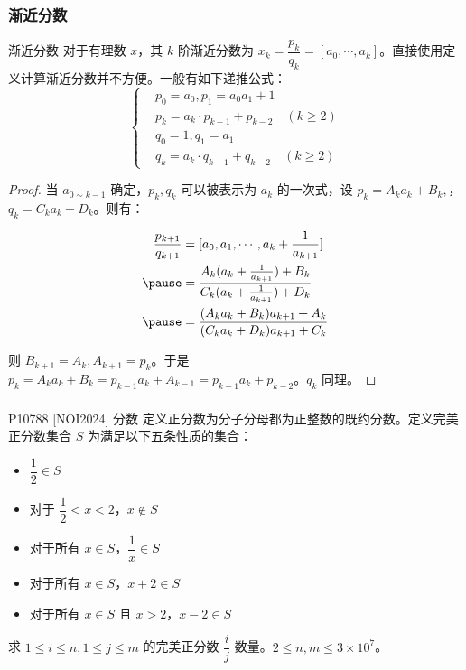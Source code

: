 \documentclass[../main.tex]{subfiles}
\begin{document}
\subsubsection{渐近分数}

\begin{frame}{渐近分数}
对于有理数 $x$，其 $k$ 阶渐近分数为 $x_k=\dfrac{p_k}{q_k}=[a_0,\cdots,a_k]$。直接使用定义计算渐近分数并不方便。一般有如下递推公式：
$$
\left\{
\begin{aligned}
&p_0=a_0,p_1=a_0a_1+1\\
&p_k=a_k\cdot p_{k-1}+p_{k-2}\quad (k\ge 2)\\
&q_0=1,q_1=a_1\\
&q_k=a_k\cdot q_{k-1}+q_{k-2}\quad (k\ge 2)
\end{aligned}
\right.
$$
\end{frame}

\begin{frame}
\begin{proof}
当 $a_{0\sim k-1}$ 确定，$p_k,q_k$ 可以被表示为 $a_k$ 的一次式，设 $p_k=A_ka_k+B_k,$，$q_k=C_ka_k+D_k$。则有：

$$
\begin{aligned}
\frac{p_{k+1}}{q_{k+1}}&=[a_0,a_1,\cdots,a_k+\frac{1}{a_{k+1}}]\\ \pause
&=\frac{A_k(a_k+\frac{1}{a_{k+1}})+B_k}{C_k(a_k+\frac{1}{a_{k+1}})+D_k}\\ \pause
&=\frac{(A_ka_k+B_k)a_{k+1}+A_k}{(C_ka_k+D_k)a_{k+1}+C_k}
\end{aligned}
$$\pause

则 $B_{k+1}=A_k,A_{k+1}=p_k$。于是 $p_k=A_ka_k+B_k=p_{k-1}a_k+A_{k-1}=p_{k-1}a_k+p_{k-2}$。$q_k$ 同理。
\end{proof}
\end{frame}

\subsubsection{}

\begin{frame}{P10788 [NOI2024] 分数}
定义正分数为分子分母都为正整数的既约分数。定义完美正分数集合 $S$ 为满足以下五条性质的集合：

\begin{itemize}
\item $\dfrac{1}{2}\in S$
\item 对于 $\dfrac{1}{2}<x<2$，$x\not\in S$
\item 对于所有 $x\in S$，$\dfrac{1}{x}\in S$
\item 对于所有 $x\in S$，$x+2\in S$
\item 对于所有 $x\in S$ 且 $x>2$，$x-2\in S$
\end{itemize}

求 $1\le i\le n,1\le j\le m$ 的完美正分数 $\dfrac{i}{j}$ 数量。$2\le n,m\le 3\times10^7$。
\end{frame}
\end{document}
